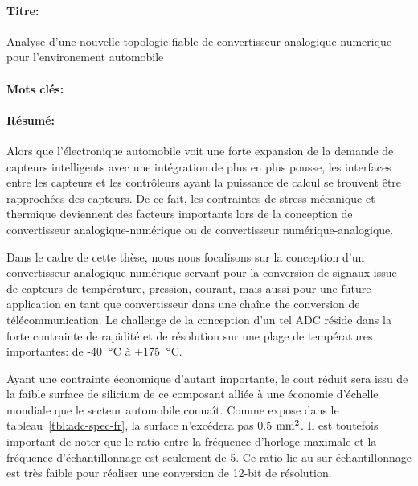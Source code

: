 \begin{mdframed}[linecolor=Prune,linewidth=1]
\vspace{-.25cm}
\paragraph*{Titre:} 
Analyse d'une nouvelle topologie fiable de convertisseur analogique-numerique pour \newline l'environement automobile
\vspace{-.25cm}
\paragraph*{Mots clés:} 

\vspace{-.5cm}
\paragraph*{Résumé:} 
Alors que l'électronique automobile voit une forte expansion de la demande de capteurs intelligents avec une intégration de plus en plus pousse, les interfaces entre les capteurs et les contrôleurs ayant la puissance de calcul se trouvent être rapprochées des capteurs. De ce fait, les contraintes de stress mécanique et thermique deviennent des facteurs importants lors de la conception de convertisseur analogique-numérique ou de convertisseur numérique-analogique.

Dans le cadre de cette thèse, nous nous focalisons sur la conception d'un convertisseur analogique-numérique servant pour la conversion de signaux issue de capteurs de température, pression, courant, mais aussi pour une future application en tant que convertisseur dans une chaîne the conversion de télécommunication. Le challenge de la conception d'un tel ADC réside dans la forte contrainte de rapidité et de résolution sur une plage de températures importantes: de -40 $\degree$C à +175 $\degree$C.

Ayant une contrainte économique d’autant importante, le cout réduit sera issu de la faible surface de silicium de ce composant alliée à une économie d’échelle mondiale que le secteur automobile connaît. Comme expose dans le tableau~\ref{tbl:adc-spec-fr}, la surface n’excédera pas 0.5 $\rm mm^2$. Il est toutefois important de noter que le ratio entre la fréquence d'horloge maximale et la fréquence d'échantillonnage est seulement de 5. Ce ratio lie au sur-échantillonnage est très faible pour réaliser une conversion de 12-bit de résolution.


\end{mdframed}
